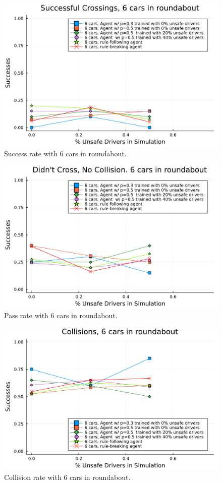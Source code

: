 \documentclass[conference]{IEEEtran}
\begin{document}
\begin{figure}[h]
	\centering
	\includegraphics[width=0.9\linewidth]{figures/successes.pdf}
	\caption{Success rate with 6 cars in roundabout.}
	\label{fig:success_6cars}
\end{figure}
\begin{figure}[h]
	\centering
	\includegraphics[width=0.9\linewidth]{figures/passes.pdf}
	\caption{Pass rate with 6 cars in roundabout.}
	\label{fig:passes_6cars}
\end{figure}
\begin{figure}[h]
	\centering
	\includegraphics[width=0.9\linewidth]{figures/collisions.pdf}
	\caption{Collision rate with 6 cars in roundabout.}
	\label{fig:collisions_6cars}
\end{figure}
\clearpage
\end{document}
